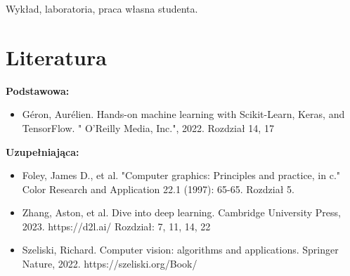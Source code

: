 \documentclass[12pt, a4paper]{article}
\begin{document}
Wykład, laboratoria, praca własna studenta.

\section{Literatura}

\textbf{Podstawowa:}
\begin{itemize}
  \item Géron, Aurélien. Hands-on machine learning with Scikit-Learn, Keras, and TensorFlow. " O'Reilly Media, Inc.", 2022.  Rozdział 14, 17
\end{itemize}

\textbf{Uzupełniająca:}
\begin{itemize}
  \item Foley, James D., et al. "Computer graphics: Principles and practice, in c." Color Research and Application 22.1 (1997): 65-65. Rozdział 5.
  \item Zhang, Aston, et al. Dive into deep learning. Cambridge University Press, 2023. https://d2l.ai/ Rozdział: 7, 11, 14, 22
  \item Szeliski, Richard. Computer vision: algorithms and applications. Springer Nature, 2022. https://szeliski.org/Book/
\end{itemize}
\end{document}

